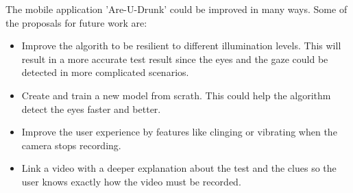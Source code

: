 The mobile application 'Are-U-Drunk' could be improved in many ways. Some of the proposals for future work are:

\begin{itemize}
  \item Improve the algorith to be resilient to different illumination levels. This will result in a more accurate test result since the eyes and the gaze could be detected in more complicated scenarios.
  \item Create and train a new model from scrath. This could help the algorithm detect the eyes faster and better.
  \item Improve the user experience by features like clinging or vibrating when the camera stops recording.
  \item Link a video with a deeper explanation about the test and the clues so the user knows exactly how the video must be recorded.
\end{itemize}
